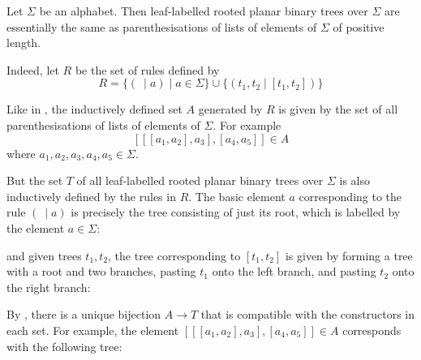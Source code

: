 \begin{example}
Let $\Sigma$ be an alphabet. Then leaf-labelled rooted planar binary trees over $\Sigma$ are essentially the same as parenthesisations of lists of elements of $\Sigma$ of positive length.

Indeed, let $R$ be the set of rules defined by
\[ R = \{ (~ \mid a) \mid a \in \Sigma \} \cup \{ (t_1,t_2 \mid [t_1,t_2]) \} \]

Like in , the inductively defined set $A$ generated by $R$ is given by the set of all parenthesisations of lists of elements of $\Sigma$. For example
\[ [[[a_1,a_2],a_3],[a_4,a_5]] \in A \]
where $a_1,a_2,a_3,a_4,a_5 \in \Sigma$.

But the set $T$ of all leaf-labelled rooted planar binary trees over $\Sigma$ is also inductively defined by the rules in $R$. The basic element $a$ corresponding to the rule $(~ \mid a)$ is precisely the tree consisting of just its root, which is labelled by the element $a \in \Sigma$:
\begin{center}
\end{center}
and given trees $t_1,t_2$, the tree corresponding to $[t_1,t_2]$ is given by forming a tree with a root and two branches, pasting $t_1$ onto the left branch, and pasting $t_2$ onto the right branch:
\begin{center}
\end{center}

By , there is a unique bijection $A \to T$ that is compatible with the constructors in each set. For example, the element $[[[a_1,a_2],a_3],[a_4,a_5]] \in A$ corresponds with the following tree:
\begin{center}
\end{center}
\end{example}

